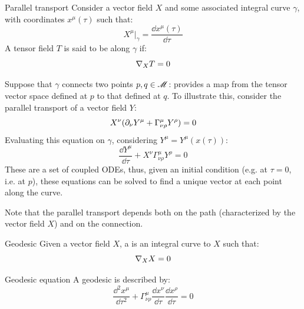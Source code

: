 \begin{definition}{Parallel transport}{}
  Consider a vector field $ X $ and some associated integral curve $ \gamma $, with coordinates $ x^\mu(\tau) $ such that:
  \begin{equation*}
    X^\mu \big\vert_\gamma = \frac{\dd x^\mu(\tau)}{\dd \tau}
  \end{equation*}
  A tensor field $ T $ is said to be  along $ \gamma $ if:
  \begin{equation}
    \nabla_X T = 0
    \label{eq:parallel-transport}
  \end{equation}
\end{definition}

Suppose that $ \gamma $ connects two points $ p,q \in \mathscr{M} $:  provides a map from the tensor vector space defined at $ p $ to that defined at $ q $. To illustrate this, consider the parallel transport of a vector field $ Y $:
\begin{equation*}
  X^\nu (\partial_\nu Y^\mu + \Gamma^\mu_{\nu \rho} Y^\rho) = 0
\end{equation*}
Evaluating this equation on $ \gamma $, considering $ Y^\mu = Y^\mu(x(\tau)) $:
\begin{equation}
  \frac{\dd Y^\mu}{\dd \tau} + X^\nu \Gamma^\mu_{\nu \rho} Y^\rho = 0
\end{equation}
These are a set of coupled ODEs, thus, given an initial condition (e.g. at $ \tau = 0 $, i.e. at $ p $), these equations can be solved to find a unique vector at each point along the curve.

Note that the parallel transport depends both on the path (characterized by the vector field $ X $) and on the connection.

\begin{definition}{Geodesic}{}
  Given a vector field $ X $, a  is an integral curve to $ X $ such that:
  \begin{equation}
    \nabla_X X = 0
    \label{eq:geodesic-def}
  \end{equation}
\end{definition}

\begin{proposition}{Geodesic equation}{}
  A geodesic is described by:
  \begin{equation}
    \frac{\dd^2 x^\mu}{\dd \tau^2} + \Gamma^\mu_{\nu \rho} \frac{\dd x^\nu}{\dd \tau} \frac{\dd x^\rho}{\dd \tau} = 0
    \label{eq:geodesic-equation}
  \end{equation}
\end{proposition}

